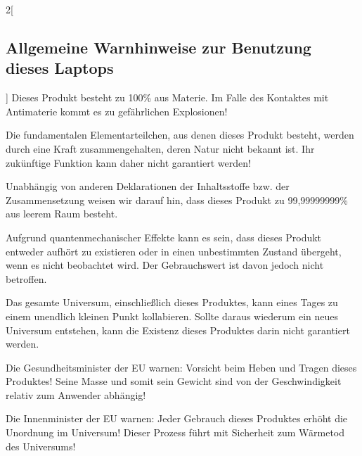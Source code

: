 \begin{multicols}{2}[\subsection{Allgemeine Warnhinweise zur Benutzung dieses
Laptops}]
\important Dieses Produkt besteht zu 100\% aus Materie. Im Falle des Kontaktes
mit Antimaterie kommt es zu gefährlichen Explosionen!

\important Die fundamentalen Elementarteilchen, aus denen dieses Produkt
besteht, werden durch eine Kraft zusammengehalten, deren Natur nicht bekannt
ist. Ihr zukünftige Funktion kann daher nicht garantiert werden!

\important Unabhängig von anderen Deklarationen der Inhaltsstoffe bzw. der
Zusammensetzung weisen wir darauf hin, dass dieses Produkt zu 99,99999999\% aus
leerem Raum besteht.

\important Aufgrund quantenmechanischer Effekte kann es sein, dass dieses
Produkt entweder aufhört zu existieren oder in einen unbestimmten Zustand
übergeht, wenn es nicht beobachtet wird. Der Gebrauchswert ist davon jedoch
nicht betroffen.

\important Das gesamte Universum, einschließlich dieses Produktes, kann eines
Tages zu einem unendlich kleinen Punkt kollabieren. Sollte daraus wiederum ein
neues Universum entstehen, kann die Existenz dieses Produktes darin nicht
garantiert werden.

\important Die Gesundheitsminister der EU warnen: Vorsicht beim Heben und
Tragen dieses Produktes! Seine Masse und somit sein Gewicht sind von der
Geschwindigkeit relativ zum Anwender abhängig!

\important Die Innenminister der EU warnen: Jeder Gebrauch dieses Produktes
erhöht die Unordnung im Universum! Dieser Prozess führt mit Sicherheit zum
Wärmetod des Universums!
\end{multicols}
